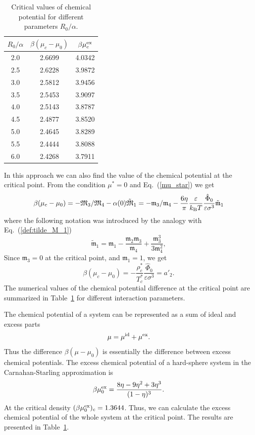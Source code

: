 \begin{table}[h]
	\caption{Critical values of chemical potential for different parameters $R_0/\alpha$.}
	\begin{center}
		\begin{tabular}{|c|c|c|}
			\hline
			$R_0/\alpha$ \quad & $\beta(\mu_c - \mu_0)$ \quad & $\beta\mu^{\rm{ex}}_c$ \quad \quad \\
			\hline
			2.0  & 2.6699 & 4.0342 \\
			2.5  & 2.6228 & 3.9872 \\
			3.0  & 2.5812 & 3.9456 \\
			3.5  & 2.5453 & 3.9097 \\
			4.0  & 2.5143 & 3.8787 \\
			4.5  & 2.4877 & 3.8520 \\
			5.0  & 2.4645 & 3.8289 \\
			5.5  & 2.4444 & 3.8088 \\
			6.0  & 2.4268 & 3.7911 \\
			\hline
		\end{tabular}
	\end{center}
	\label{tab:critical_chem_potential}
\end{table}

In this approach we can also find the value of the chemical potential at the critical point. From the condition $\mu^*=0$ and Eq.~(\ref{mu_star}) we get
$$
\beta(\mu_c - \mu_0) = -\mathfrak{M}_3/\mathfrak{M}_4 - \alpha(0)\tilde{\mathfrak{M}}_1 
= -\mathfrak{m}_3/\mathfrak{m}_4 - \frac{6\eta}{\pi} \frac{\varepsilon}{k_{\rm{B}}T} \frac{\hat{\Phi}_0}{\varepsilon\sigma^3} \tilde{\mathfrak{m}}_1
$$
where the following notation was introduced by the analogy with Eq.~(\ref{def:tilde_M_1})
\begin{equation}
	\tilde{\mathfrak{m}}_1 = \mathfrak{m}_1 -\frac{\mathfrak{m}_2 \mathfrak{m}_3}{\mathfrak{m}_4} + \frac{\mathfrak{m}_3^3}{3\mathfrak{m}_4^2},
\end{equation}
Since $\mathfrak{m}_3 = 0$ at the critical point, and $\mathfrak{m}_1 = 1$, we get
\begin{equation}
	\beta(\mu_c - \mu_0) = -\frac{\rho^*_c}{T^*_c} \frac{\hat{\Phi}_0}{\varepsilon\sigma^3} = a'_2.
\end{equation}
The numerical values of the chemical potential difference at the critical point are summarized in Table~\ref{tab:critical_chem_potential} for different interaction parameters.

The chemical potential of a system can be represented as a sum of ideal and excess parts
$$
\mu = \mu^{\rm{id}} + \mu^{\rm{ex}}.
$$
Thus the difference $\beta(\mu - \mu_0)$ is essentially the difference between excess chemical potentials. The excess chemical potential of a hard-sphere system in the Carnahan-Starling approximation is
\begin{equation}
	\beta\mu^{\rm{ex}}_0 = \frac{8\eta - 9\eta^2 + 3\eta^3}{(1-\eta)^3}.
\end{equation}
At the critical density $(\beta\mu^{\rm{ex}}_0)_c = 1.3644$. Thus, we can calculate the excess chemical potential of the whole system at the critical point. The results are presented in Table~\ref{tab:critical_chem_potential}.
